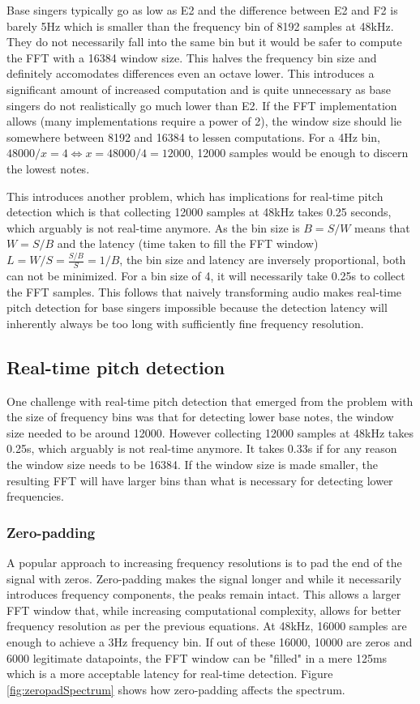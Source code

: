 Base singers typically go as low as E2 and the difference between E2 and F2 is barely 5Hz which is smaller than the frequency bin of 8192 samples at 48kHz. They do not necessarily fall into the same bin but it would be safer to compute the FFT with a 16384 window size. This halves the frequency bin size and definitely accomodates differences even an octave lower. This introduces a significant amount of increased computation and is quite unnecessary as base singers do not realistically go much lower than E2. If the FFT implementation allows (many implementations require a power of 2), the window size should lie somewhere between 8192 and 16384 to lessen computations. For a 4Hz bin, $48000/x = 4 \iff x = 48000/4 = 12000$, 12000 samples would be enough to discern the lowest notes. 

This introduces another problem, which has implications for real-time pitch detection which is that collecting 12000 samples at 48kHz takes 0.25 seconds, which arguably is not real-time anymore. As the bin size is $B = S/W$ means that $W = S/B$ and the latency (time taken to fill the FFT window) $L = W/S = \frac{S/B}{S} = 1/B$, the bin size and latency are inversely proportional, both can not be minimized. For a bin size of 4, it will necessarily take 0.25s to collect the FFT samples. This follows that naively transforming audio makes real-time pitch detection for base singers impossible because the detection latency will inherently always be too long with sufficiently fine frequency resolution.

\subsection{Real-time pitch detection}
One challenge with real-time pitch detection that emerged from the problem with the size of frequency bins was that for detecting lower base notes, the window size needed to be around 12000. However collecting 12000 samples at 48kHz takes 0.25s, which arguably is not real-time anymore. It takes 0.33s if for any reason the window size needs to be 16384. If the window size is made smaller, the resulting FFT will have larger bins than what is necessary for detecting lower frequencies. 

\subsubsection{Zero-padding}
A popular approach to increasing frequency resolutions is to pad the end of the signal with zeros. Zero-padding makes the signal longer and while it necessarily introduces frequency components, the peaks remain intact. This allows a larger FFT window that, while increasing computational complexity, allows for better frequency resolution as per the previous equations. At 48kHz, 16000 samples are enough to achieve a 3Hz frequency bin. If out of these 16000, 10000 are zeros and 6000 legitimate datapoints, the FFT window can be "filled" in a mere 125ms which is a more acceptable latency for real-time detection. Figure \ref{fig:zeropadSpectrum} shows how zero-padding affects the spectrum.

